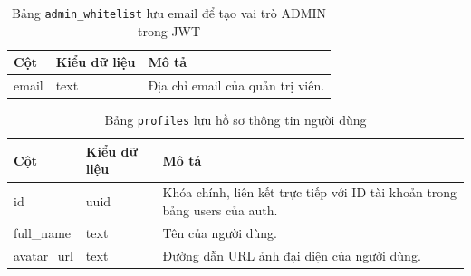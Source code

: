 \begin{table}[H]
\centering
\begin{tabular}{|l|l|p{6cm}|}
\hline
\textbf{Cột} & \textbf{Kiểu dữ liệu} & \textbf{Mô tả} \\ \hline
email & text & Địa chỉ email của quản trị viên. \\ \hline
\end{tabular}
\caption{Bảng \texttt{admin\_whitelist} lưu email để tạo vai trò ADMIN trong JWT}
\end{table}

\begin{table}[H]
\centering
\begin{tabular}{|l|l|p{6cm}|}
\hline
\textbf{Cột} & \textbf{Kiểu dữ liệu} & \textbf{Mô tả} \\ \hline
id & uuid & Khóa chính, liên kết trực tiếp với ID tài khoản trong bảng users của auth. \\ \hline
full\_name & text & Tên của người dùng. \\ \hline
avatar\_url & text & Đường dẫn URL ảnh đại diện của người dùng. \\ \hline
\end{tabular}
\caption{Bảng \texttt{profiles} lưu hồ sơ thông tin người dùng}
\end{table}
